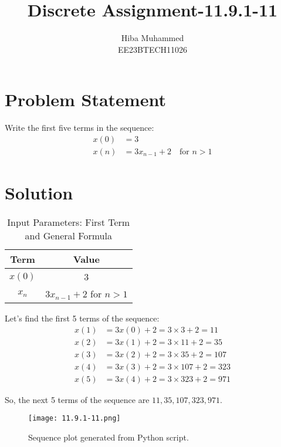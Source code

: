 \documentclass[12pt]{article}
\begin{document}
\title{Discrete Assignment-11.9.1-11}
\author{Hiba Muhammed \\
        EE23BTECH11026}
\maketitle

\section*{Problem Statement}
Write the first five terms in the sequence:
\[
\begin{aligned}
x(0)  &= 3 \\
x(n)  &= 3x_{n-1} + 2 \quad \text{for } n > 1
\end{aligned}
\]

\section*{Solution}
\begin{table}[h]
  \centering
  \caption{Input Parameters: First Term and General Formula}
  \begin{tabular}{|c|c|}
    \hline
    \textbf{Term} & \textbf{Value} \\
    \hline
    \(x(0) \) & 3 \\
    \(x_{n}\) & \(3x_{n-1} + 2\) for \(n > 1\) \\
    \hline
  \end{tabular}
\end{table}
Let's find the first 5 terms of the sequence:
\begin{align}
x(1) &= 3x(0)  + 2 = 3 \times 3 + 2 = 11 \\x(2) &= 3x(1) + 2 = 3 \times 11 + 2 = 35 \\
x(3) &= 3x(2) + 2 = 3 \times 35 + 2 = 107 \\x(4) &= 3x(3) + 2 = 3 \times 107 + 2 = 323 \\
x(5) &= 3x(4) + 2 = 3 \times 323 + 2 = 971 
\end{align}

So, the next 5 terms of the sequence are \(11, 35, 107, 323, 971\).
\begin{figure}[h]
    \centering
    \texttt{[image: 11.9.1-11.png]}
    \caption{Sequence plot generated from Python script.}
    \label{fig:sequence-plot}
\end{figure}
\end{document}

